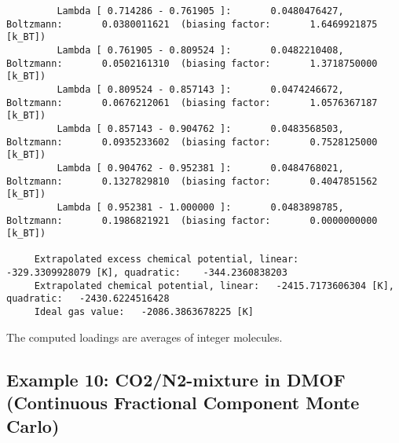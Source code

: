 \begin{tiny}
\begin{verbatim}
         Lambda [ 0.714286 - 0.761905 ]:       0.0480476427, Boltzmann:       0.0380011621  (biasing factor:       1.6469921875 [k_BT])
         Lambda [ 0.761905 - 0.809524 ]:       0.0482210408, Boltzmann:       0.0502161310  (biasing factor:       1.3718750000 [k_BT])
         Lambda [ 0.809524 - 0.857143 ]:       0.0474246672, Boltzmann:       0.0676212061  (biasing factor:       1.0576367187 [k_BT])
         Lambda [ 0.857143 - 0.904762 ]:       0.0483568503, Boltzmann:       0.0935233602  (biasing factor:       0.7528125000 [k_BT])
         Lambda [ 0.904762 - 0.952381 ]:       0.0484768021, Boltzmann:       0.1327829810  (biasing factor:       0.4047851562 [k_BT])
         Lambda [ 0.952381 - 1.000000 ]:       0.0483898785, Boltzmann:       0.1986821921  (biasing factor:       0.0000000000 [k_BT])

     Extrapolated excess chemical potential, linear:    -329.3309928079 [K], quadratic:    -344.2360838203
     Extrapolated chemical potential, linear:   -2415.7173606304 [K], quadratic:   -2430.6224516428
     Ideal gas value:   -2086.3863678225 [K]
\end{verbatim}
\end{tiny}

The computed loadings are averages of integer molecules.

\subsection*{Example 10: CO2/N2-mixture in DMOF (Continuous Fractional Component Monte Carlo)}

